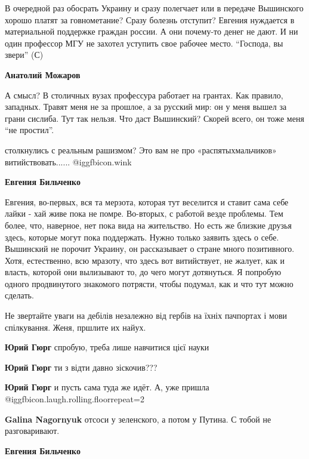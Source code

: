 \begin{itemize}
\begin{itemize}
В очередной раз обосрать Украину и сразу полегчает или в передаче Вышинского
хорошо платят за говнометание? Сразу болезнь отступит? Евгения нуждается в
материальной поддержке граждан россии. А они почему-то денег не дают. И ни один
профессор МГУ не захотел уступить свое рабочее место. \enquote{Господа, вы звери} (С)

\textbf{Анатолий Можаров} 

А смысл? В столичных вузах профессура работает на грантах. Как правило,
западных. Травят меня не за прошлое, а за русский мир: он у меня вышел за грани
сислиба. Тут так нельзя. Что даст Вышинский? Скорей всего, он тоже меня \enquote{не
простил}.

столкнулись с реальным рашизмом? Это вам не про «распятыхмальчиков» витийствовать......  @igg{fbicon.wink} 

\textbf{Евгения Бильченко} 

Евгения, во-первых, вся та мерзота, которая тут веселится и ставит сама себе
лайки - хай живе пока не помре. Во-вторых, с работой везде проблемы. Тем более,
что, наверное, нет пока вида на жительство. Но есть же близкие друзья здесь,
которые могут пока поддержать. Нужно только заявить здесь о себе. Вышинский не
порочит Украину, он рассказывает о стране много позитивного. Хотя, естественно,
всю мразоту, что здесь вот витийствует, не жалует, как и власть, которой они
вылизывают то, до чего могут дотянуться. Я попробую одного продвинутого
знакомого потрясти, чтобы подумал, как и что тут можно сделать.

\end{itemize} %


Не звертайте уваги на дебілів незалежно від гербів на їхніх пачпортах і мови
спілкування. Женя, пршлите их найух.

\begin{itemize} %
\textbf{Юрий Гюрг} спробую, треба лише навчитися цієї науки

\textbf{Юрий Гюрг} ти з відти давно зіскочив???

\textbf{Юрий Гюрг} и пусть сама туда же идёт. А, уже пришла  @igg{fbicon.laugh.rolling.floor}{repeat=2} 

\textbf{Galina Nagornyuk} отсоси у зеленского, а потом у Путина. С тобой не разговаривают.

\textbf{Евгения Бильченко} 


\end{itemize}
\end{itemize}
